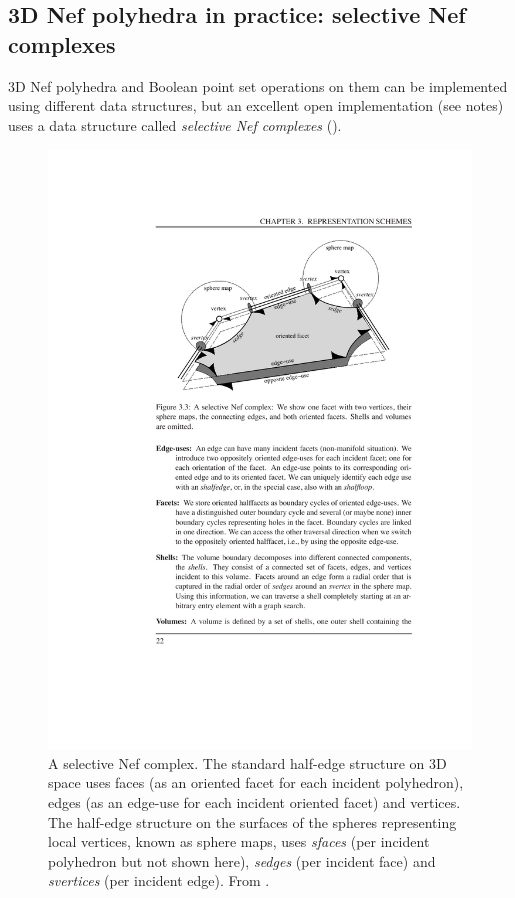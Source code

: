 \subsection{3D Nef polyhedra in practice: selective Nef complexes}

3D Nef polyhedra and Boolean point set operations on them can be implemented using different data structures, but an excellent open implementation (see notes) uses a data structure called \emph{selective Nef complexes} ().

\begin{figure}
\includegraphics[width=\linewidth]{figs/snc}
\caption{A selective Nef complex.
The standard half-edge structure on 3D space uses faces (as an oriented facet for each incident polyhedron), edges (as an edge-use for each incident oriented facet) and vertices.
The half-edge structure on the surfaces of the spheres representing local vertices, known as sphere maps, uses \emph{sfaces} (per incident polyhedron but not shown here), \emph{sedges} (per incident face) and \emph{svertices} (per incident edge).
From \citet{Hachenberger06}.}%
\label{fig:snc}
\end{figure}

